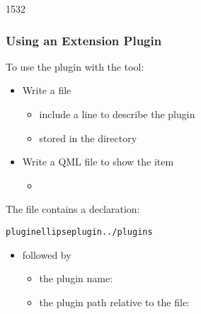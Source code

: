 \begin{slide}[fragile]{1532}\frametitle{Using an Extension Plugin}

To use the plugin with the  tool:

\begin{itemize}
\item Write a  file
  \begin{itemize}
  \item include a line to describe the plugin
  \item stored in the  directory
  \end{itemize}
\vspace*{0.5em}
\item Write a QML file to show the item
  \begin{itemize}
  \item {}
  \end{itemize}
\end{itemize}

\vspace*{1em}
The  file contains a declaration:

\begin{alltt}
plugin ellipseplugin ../plugins
\end{alltt}

\begin{itemize}
\item \textbf{} followed by
  \begin{itemize}
  \item the plugin name: \textbf{}
  \item the plugin path relative to the  file: \textbf{}
  \end{itemize}
\end{itemize}

\end{slide}

